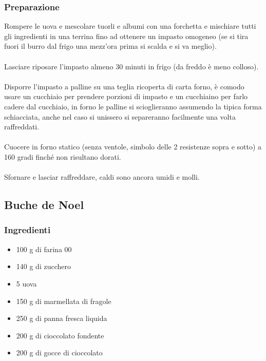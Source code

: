 \documentclass[12pt, a4paper]{article}
\begin{document}
\subsubsection{Preparazione}
	Rompere le uova e mescolare tuorli e albumi con una forchetta e
	mischiare tutti gli ingredienti in una terrina fino ad ottenere un 
	impasto omogeneo (se si tira fuori il burro dal frigo una mezz'ora prima 
	si scalda e si va meglio).\\\\
	Lasciare riposare l'impasto almeno 30 minuti in frigo (da freddo è
	meno colloso).\\\\
	Disporre l'impasto a palline su una teglia ricoperta di carta forno,
	è comodo usare un cucchiaio per prendere porzioni di impasto e un
	cucchiaino per farlo cadere dal cucchiaio, in forno le palline si
	scioglieranno assumendo la tipica forma schiacciata, anche nel caso
	si unissero si separeranno facilmente una volta raffreddati.\\\\
	Cuocere in forno statico (senza ventole, simbolo delle 2 resistenze
	sopra e sotto) a 160 gradi finché non risultano dorati.\\\\
	Sfornare e lasciar raffreddare, caldi sono ancora umidi e molli.
\clearpage

\subsection{Buche de Noel}

\subsubsection{Ingredienti}
\begin{itemize}
\item   100 g di farina 00
\item	140 g di zucchero
\item	5 uova
\item	150 g di marmellata di fragole
\item	250 g di panna fresca liquida
\item	200 g di cioccolato fondente
\item	200 g di gocce di cioccolato
\end{itemize}

\clearpage
\end{document}
